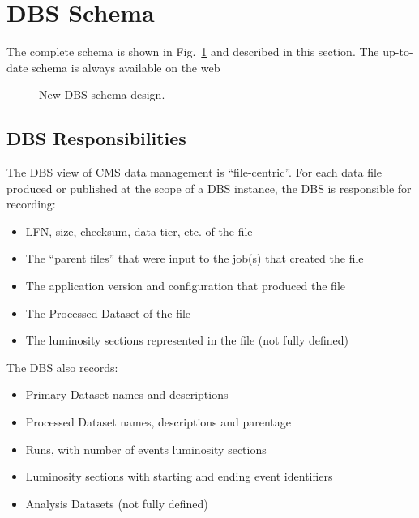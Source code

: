 \documentclass{cmspaper}
\begin{document}
\section{DBS Schema}

The complete schema is shown in  Fig.~\ref{fig:new-dbs-schema-design} and described in this section. The up-to-date schema is always available on the web~\cite{dbs-schema}
\begin{figure}[hbtp]
  \begin{center}
    \caption{New DBS schema design.}
    \label{fig:new-dbs-schema-design}
  \end{center}
\end{figure} 
\subsection{DBS Responsibilities}



The DBS view of CMS data management is ``file-centric''.
For each data file produced or published at the scope of a DBS instance,
the DBS is responsible for recording:

\begin{itemize}
\item LFN, size, checksum, data tier, etc. of the file
\item The ``parent files'' that were input to the job(s)
that created the file
\item The application version and configuration that produced
the file
\item The Processed Dataset of the file
\item The luminosity sections represented in the file (not fully
defined)
\end{itemize}

The DBS also records:

\begin{itemize}
\item Primary Dataset names and descriptions
\item Processed Dataset names, descriptions and parentage
\item Runs, with number of events luminosity sections
\item Luminosity sections with starting and ending event identifiers
\item Analysis Datasets (not fully defined)
\end{itemize}
\end{document}
